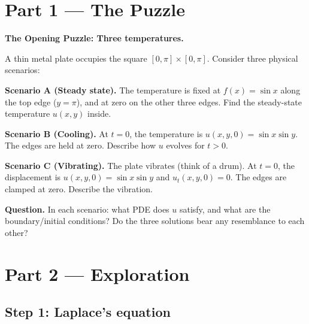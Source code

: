 \documentclass[12pt,a4paper]{article}
\begin{document}
\newpage

\section{Part 1 \texorpdfstring{---}{--} The Puzzle}

\begin{puzzlebox}
\textbf{The Opening Puzzle: Three temperatures.}

A thin metal plate occupies the square $[0,\pi]\times[0,\pi]$. Consider three physical scenarios:

\medskip
\textbf{Scenario A (Steady state).} The temperature is fixed at $f(x) = \sin x$ along the top edge ($y=\pi$), and at zero on the other three edges. Find the steady-state temperature $u(x,y)$ inside.

\textbf{Scenario B (Cooling).} At $t=0$, the temperature is $u(x,y,0) = \sin x\sin y$. The edges are held at zero. Describe how $u$ evolves for $t>0$.

\textbf{Scenario C (Vibrating).} The plate vibrates (think of a drum). At $t=0$, the displacement is $u(x,y,0) = \sin x\sin y$ and $u_t(x,y,0) = 0$. The edges are clamped at zero. Describe the vibration.

\medskip
\textbf{Question.} In each scenario: what PDE does $u$ satisfy, and what are the boundary/initial conditions? Do the three solutions bear any resemblance to each other?
\end{puzzlebox}

\section{Part 2 \texorpdfstring{---}{--} Exploration}

\subsection{Step 1: Laplace's equation}
\end{document}
